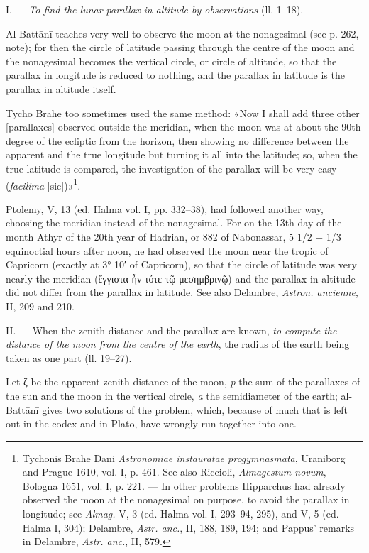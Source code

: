 \documentclass[11pt]{article}
\begin{document}
\par I. — \emph{To find the lunar parallax in altitude by observations} (ll. 1–18).\par
\par Al-Battānī teaches very well to observe the moon at the nonagesimal (see p. 262, note); for then the circle of latitude passing through the centre of the moon and the nonagesimal becomes the vertical circle, or circle of altitude, so that the parallax in longitude is reduced to nothing, and the parallax in latitude is the parallax in altitude itself.\par
\par Tycho Brahe too sometimes used the same method: «Now I shall add three other [parallaxes] observed outside the meridian, when the moon was at about the 90th degree of the ecliptic from the horizon, then showing no difference between the apparent and the true longitude but turning it all into the latitude; so, when the true latitude is compared, the investigation of the parallax will be very easy (\emph{facilima} [sic])»\footnote{Tychonis Brahe Dani \emph{Astronomiae instauratae progymnasmata}, Uraniborg and Prague 1610, vol. I, p. 461. See also Riccioli, \emph{Almagestum novum}, Bologna 1651, vol. I, p. 221. — In other problems Hipparchus had already observed the moon at the nonagesimal on purpose, to avoid the parallax in longitude; see \emph{Almag.} V, 3 (ed. Halma vol. I, 293–94, 295), and V, 5 (ed. Halma I, 304); Delambre, \emph{Astr. anc.}, II, 188, 189, 194; and Pappus' remarks in Delambre, \emph{Astr. anc.}, II, 579.}.\par
\par Ptolemy, V, 13 (ed. Halma vol. I, pp. 332–38), had followed another way, choosing the meridian instead of the nonagesimal. For on the 13th day of the month Athyr of the 20th year of Hadrian, or 882 of Nabonassar, 5 1/2 + 1/3 equinoctial hours after noon, he had observed the moon near the tropic of Capricorn (exactly at 3° 10′ of Capricorn), so that the circle of latitude was very nearly the meridian ({\greekfont ἔγγιστα ἦν τότε τῷ μεσημβρινῷ}) and the parallax in altitude did not differ from the parallax in latitude. See also Delambre, \emph{Astron. ancienne}, II, 209 and 210.\par
\par II. — When the zenith distance and the parallax are known, \emph{to compute the distance of the moon from the centre of the earth}, the radius of the earth being taken as one part (ll. 19–27).\par
\par Let {\greekfont ζ} be the apparent zenith distance of the moon, \emph{p} the sum of the parallaxes of the sun and the moon in the vertical circle, \emph{a} the semidiameter of the earth; al-Battānī gives two solutions of the problem, which, because of much that is left out in the codex and in Plato, have wrongly run together into one.\par
\end{document}
